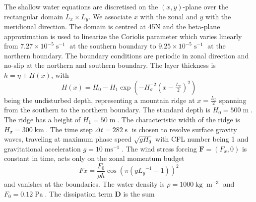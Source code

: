 \documentclass[draft]{agujournal2019}
\newcommand{\op}{\operatorname}
\begin{document}
The shallow water equations are discretised on the $(x,y)$-plane over the rectangular domain $L_x \times L_y$. We associate $x$ with the zonal and $y$ with the meridional direction. The domain is centred at 45N and the beta-plane approximation \cite{Vallis2006} is used to linearize the Coriolis parameter which varies linearly from $7.27 \times 10^{-5}\op{s}^{-1}$ at the southern boundary to $9.25 \times 10^{-5}\op{s}^{-1}$ at the northern boundary. The boundary conditions are periodic in zonal direction and no-slip at the northern and southern boundary. The layer thickness is $h = \eta + H(x)$, with
\begin{equation}
H(x) = H_0 - H_1\exp\left(-H_\sigma^{-2}(x-\tfrac{L_x}{2})^2\right)
\end{equation}
being the undisturbed depth, representing a mountain ridge at $x=\tfrac{L_x}{2}$ spanning from the southern to the northern boundary. The standard depth is $H_0 = 500\op{m}$. The ridge has a height of $H_1 = 50\op{m}$. The characteristic width of the ridge is $H_\sigma = 300\op{km}$. The time step $\Delta t = 282\op{s}$ is chosen to resolve surface gravity waves, traveling at maximum phase speed $\sqrt{gH_0}$ with CFL number being 1 and gravitational acceleration $g=10\op{ms}^{-1}$. The wind stress forcing $\mathbf{F} = (F_x,0)$ is constant in time, acts only on the zonal momentum budget
\begin{equation}
Fx = \frac{F_0}{\rho h} \cos\left(\pi\left(y{L_y}^{-1} - 1\right)\right)^2
\end{equation}
and vanishes at the boundaries. The water density is $\rho = 1000\op{kg}\op{m}^{-3}$ and $F_0 = 0.12\op{Pa}$. The dissipation term $\mathbf{D}$ is the sum
\end{document}
